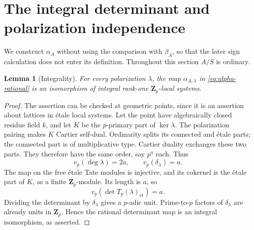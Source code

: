 \documentclass[11pt]{article}
\newtheorem{lemma}[theorem]{Lemma}
\theoremstyle{definition}\newtheorem{definition}[theorem]{Definition}
\theoremstyle{remark}\newtheorem{remark}[theorem]{Remark}
\newcommand{\ZZ}{\mathbf Z}
\newcommand{\et}{\mathrm{et}}
\begin{document}
\section{The integral determinant and polarization independence}\label{sec:alpha}

We construct $\alpha_A$ without using the comparison with $\beta_A$, so that the later sign calculation does not enter its definition. Throughout this section $A/S$ is ordinary.

\begin{lemma}[Integrality]\label{lem:integral}
For every polarization $\lambda$, the map $\alpha_{A,\lambda}$ in \eqref{eq:alpha-rational} is an isomorphism of integral rank-one $\ZZ_p$-local systems.
\end{lemma}
\begin{proof}
The assertion can be checked at geometric points, since it is an assertion about lattices in \'etale local systems. Let the point have algebraically closed residue field $k$, and let $K$ be the $p$-primary part of $\ker\lambda$. The polarization pairing makes $K$ Cartier self-dual. Ordinarity splits its connected and \'etale parts; the connected part is of multiplicative type. Cartier duality exchanges these two parts. They therefore have the same order, say $p^a$ each. Thus
\[
 v_p(\deg\lambda)=2a,\qquad v_p(\delta_\lambda)=a.
\]
The map on the free \'etale Tate modules is injective, and its cokernel is the \'etale part of $K$, as a finite $\ZZ_p$-module. Its length is $a$, so
\[
 v_p(\det T_p(\lambda)_{\et})=a.
\]
Dividing the determinant by $\delta_\lambda$ gives a $p$-adic unit. Prime-to-$p$ factors of $\delta_\lambda$ are already units in $\ZZ_p$. Hence the rational determinant map is an integral isomorphism, as asserted.
\end{proof}
\end{document}
